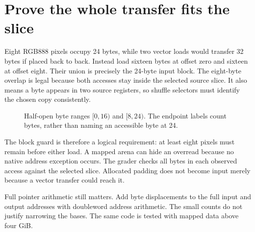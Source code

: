 \section{Prove the whole transfer fits the slice}\label{rgb-footprint}
Eight RGB888 pixels occupy 24 bytes, while two vector loads would transfer 32 bytes
if placed back to back. Instead load sixteen bytes at offset zero and sixteen at
offset eight. Their union is precisely the 24-byte input block. The eight-byte
overlap is legal because both accesses stay inside the selected source slice.
It also means a byte appears in two source registers, so shuffle selectors must
identify the chosen copy consistently.

\begin{figure}[htbp]
  \centering
  \caption{Half-open byte ranges $[0,16)$ and $[8,24)$. The endpoint labels count bytes, rather than naming an accessible byte at 24.}
\end{figure}

The block guard is therefore a logical requirement: at least eight pixels must
remain before either load. A mapped arena can hide an overread because no native
address exception occurs. The grader checks all bytes in each observed access
against the selected slice. Allocated padding does not become input merely because
a vector transfer could reach it.

Full pointer arithmetic still matters. Add byte displacements to the full input
and output addresses with doubleword address arithmetic. The small counts do not
justify narrowing the bases. The same code is tested with mapped data above four GiB.
